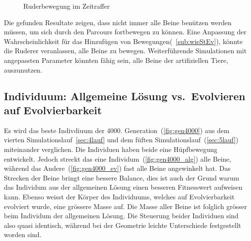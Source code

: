 \begin{figure}[H]
        \caption{Ruderbewegung im Zeitraffer\label{fig:ruder}}

      \end{figure}

      Die gefunden Resultate zeigen,
      dass nicht immer alle Beine benützen werden müssen, um sich durch den Parcours fortbewegen zu können.
      Eine Anpassung der Wahrscheinlichkeit für das Hinzufügen von Bewegungen(~\vref{sub:wieStEv}),
      könnte die Ruderer veranlassen, alle Beine zu bewegen.
      Weiterführende Simulationen mit angepassten Parameter könnten fähig sein,
      alle Beine der artifiziellen Tiere, auszunutzen.

    \subsection{Individuum: Allgemeine Lösung vs.\ Evolvieren auf Evolvierbarkeit}

      Es wird das beste Indivdiuum der 4000. Generation~(\vref{fig:gen4000}) aus dem vierten Simulationslauf~\vref{sec:4lauf}
      und dem füften Simulationslauf~(\vref{sec:5lauf}) miteinander verglichen.
      Die Individuen haben beide eine Hüpfbewegung entwickelt.
      Jedoch streckt das eine Individum~(\vref{fig:gen4000_alg}) alle Beine,
      während das Andere~(\vref{fig:gen4000_ev}) fast alle Beine angewinkelt hat.
      Das Strecken der Beine bringt eine bessere Balance,
      dies ist auch der Grund warum das Individum aus der allgemeinen Lösung einen besseren Fitnesswert aufweisen kann.
      Ebenso weisst der Körper des Individuums, welches auf Evolvierbarkeit evolviert wurde, eine grössere Masse auf.
      Die Masse aller Beine ist folglich grösser beim Individum der allgemeinen Lösung.
      Die Steuerung beider Individuen sind also quasi identisch,
      während bei der Geometrie leichte Unterschiede festgestellt worden sind.

